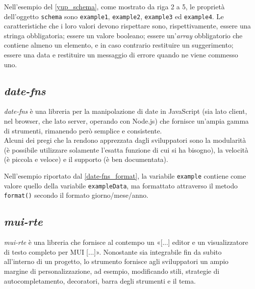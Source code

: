 Nell'esempio del \autoref{yup_schema}, come mostrato da riga 2 a 5, le proprietà dell'oggetto \texttt{schema} sono \texttt{example1}, \texttt{example2}, \texttt{example3} ed \texttt{example4}. Le caratteristiche che i loro valori devono rispettare sono, rispettivamente, essere una stringa obbligatoria; essere un valore booleano; essere un'\textit{array} obbligatorio che contiene almeno un elemento, e in caso contrario restituire un suggerimento; essere una data e restituire un messaggio di errore quando ne viene commesso uno.



\subsection{\textit{date-fns}}
\label{subsec:date-fns}
\textit{date-fns} è una libreria per la manipolazione di date in JavaScript (sia lato client, nel browser, che lato server, operando con Node.js) che fornisce un'ampia gamma di strumenti, rimanendo però semplice e consistente.\\
Alcuni dei pregi che la rendono apprezzata dagli sviluppatori sono la modularità (è possibile utilizzare solamente l'esatta funzione di cui si ha bisogno), la velocità (è piccola e veloce) e il supporto (è ben documentata)\cite{date-fns}.

Nell'esempio riportato dal \autoref{date-fns_format}, la variabile \texttt{example} contiene come valore quello della variabile \texttt{exampleData}, ma formattato attraverso il metodo \texttt{format()} secondo il formato giorno/mese/anno. 



\subsection{\textit{mui-rte}}
\textit{mui-rte} è una libreria che fornisce al contempo un «[...] editor e un visualizzatore di testo completo per MUI [...]»\cite{niuware_mui-rte}. Nonostante sia integrabile fin da subito all'interno di un progetto, lo strumento fornisce agli sviluppatori un ampio margine di personalizzazione, ad esempio, modificando stili, strategie di autocompletamento, decoratori, barra degli strumenti e il tema.

